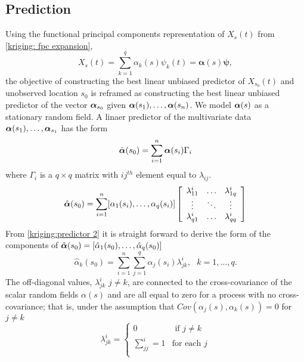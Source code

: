 \subsection{Prediction} 

\label{sec:functional_kriging_predictor}

Using the functional principal components representation of $X_s(t)$ from \eqref{kriging: fpc expansion},
\begin{equation}
	X_{s}(t) = \sum_{k=1}^{q} \alpha_k(s)\psi_k(t) = \boldsymbol{\alpha}(s)\boldsymbol{\psi}, 
\end{equation}
the objective of constructing the best linear unbiased predictor of $X_{s_0}(t)$ and unobserved location $s_0$ is reframed as constructing the best linear unbiased predictor of the vector $\boldsymbol\alpha_{s_0}$ given $\boldsymbol\alpha(s_1), \dots, \boldsymbol\alpha(s_n)$. We model $\boldsymbol\alpha(s)$ as a stationary random field. A linaer predictor of the multivariate data $\boldsymbol\alpha(s_1), \dots, \boldsymbol\alpha_{s_1}$ has the form
\begin{equation}
	\hat{\boldsymbol\alpha}(s_0) = \sum_{i=1}^n \boldsymbol\alpha(s_i)\Gamma_i \label{kriging:predictor}
\end{equation}
where $\Gamma_i$ is a $q \times q$ matrix with $ij^{th}$ element equal to $\lambda_{ij}$. 
\begin{equation}
		\hat{\boldsymbol\alpha}(s_0) = \sum_{i=1}^n [\alpha_1(s_i), \dots, \alpha_q(s_i)] 
		\left[ 
			\begin{array}{ccc}
				\lambda^i_{11} & \dots & \lambda^i_{1q}\\
				\vdots & \ddots & \vdots \\
				\lambda^i_{q1} & \dots & \lambda^i_{qq}
			\end{array}
		\right]
		\label{kriging:predictor 2}
\end{equation}
From \eqref{kriging:predictor 2} it is straight forward to derive the form of the components of $\hat{\boldsymbol\alpha}(s_0)=[\hat{\alpha}_1(s_0), \dots, \hat{\alpha}_q(s_0)]$
\begin{equation}
	\hat{\alpha}_k(s_0) = \sum_{i=1}^n\sum_{j=1}^q\alpha_j(s_i)\lambda^i_{jk}, \mbox{ } k = 1, \dots, q.
\end{equation}
The off-diagonal values, $\lambda^i_{jk}$ $j \neq k$, are connected to the cross-covariance of the scalar random fields $\alpha(s)$ and are all equal to zero for a process with no cross-covariance; that is, under the assumption that $Cov(\alpha_j(s), \alpha_k(s)) = 0$ for $j \neq k$
\begin{equation}
	\lambda^i_{jk} = \begin{cases}
														0 & \text{ if } j \neq k\\
														\sum_{jj}^i = 1 & \text{for each $j$}\\
 										\end{cases}
\end{equation}

